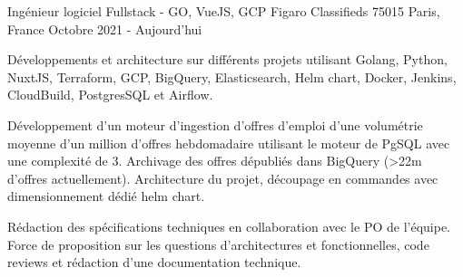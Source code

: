 \cventry
{Ingénieur logiciel Fullstack - GO, VueJS, GCP} %
{Figaro Classifieds} %
{75015 Paris, France} %
{Octobre 2021 - Aujourd'hui} %
{
    \begin{cvitems} %
        \item
        {
            Développements et architecture sur différents projets utilisant Golang, Python, NuxtJS, Terraform, GCP, BigQuery,
        Elasticsearch, Helm chart, Docker, Jenkins, CloudBuild, PostgresSQL et Airflow.
        }
        \item
        {
            Développement d'un moteur d'ingestion d'offres d'emploi d'une volumétrie moyenne d'un million d'offres hebdomadaire
            utilisant le moteur de PgSQL avec une complexité de 3. Archivage des offres dépubliés dans BigQuery (>22m
        d'offres actuellement). Architecture du projet, découpage en commandes avec dimensionnement dédié helm chart.
        }
        \item
        {
            Rédaction des spécifications techniques en collaboration avec le PO de l'équipe. Force de proposition sur
            les questions d’architectures et fonctionnelles, code reviews et rédaction d'une documentation technique.
        }
    \end{cvitems}
}
